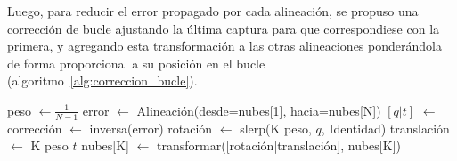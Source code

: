 	Luego, para reducir el error propagado por cada alineación, se propuso una
	corrección de bucle
	ajustando la última captura para que correspondiese con la primera,
	y agregando esta transformación a las otras alineaciones ponderándola de forma
	proporcional a su posición en el bucle (algoritmo~\ref{alg:correccion_bucle}).

	\begin{algorithm}
		\begin{algorithmic}[1]
				\State peso $\gets \frac{1}{N-1}$
				\State error $\gets$ Alineación(desde=nubes[1], hacia=nubes[N])
				\State $[q|t]$ $\gets$ corrección $\gets$ inversa(error)
					\State rotación $\gets$ slerp(K peso, $q$, Identidad)
					\State translación $\gets$ K peso $t$
					\State nubes[K] $\gets$ transformar([rotación|translación], nubes[K])
				\EndFor
			\EndFunction
		\end{algorithmic}
		{\label{alg:correccion_bucle}}
	\end{algorithm}
